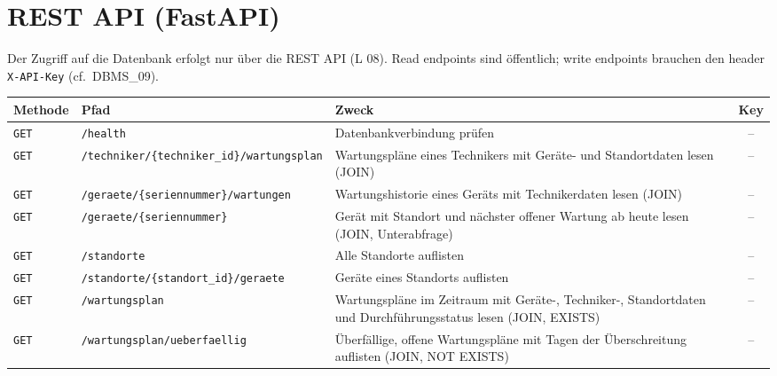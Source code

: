 \documentclass[11pt,a4paper]{article}
\begin{document}
\section{REST API (FastAPI)}

Der Zugriff auf die Datenbank erfolgt nur über die REST API (L 08). Read endpoints
sind öffentlich; write endpoints brauchen den header \texttt{X-API-Key} (cf.\ DBMS\_09).

\renewcommand{\arraystretch}{1.2}
\begingroup
\small
\renewcommand{\arraystretch}{1.2}

\begin{tabularx}{\linewidth}{
    @{}
    l
    >{\raggedright\arraybackslash}p{5.8cm}
    >{\raggedright\arraybackslash}X
    c
    @{}
}
\toprule
\textbf{Methode} & \textbf{Pfad} & \textbf{Zweck} & \textbf{Key} \\
\midrule

\texttt{GET}
& \nolinkurl{/health}
& Datenbankverbindung prüfen
& -- \\

\texttt{GET}
& \nolinkurl{/techniker/{techniker_id}/wartungsplan}
& Wartungspläne eines Technikers mit Geräte- und Standortdaten lesen (JOIN)
& -- \\

\texttt{GET}
& \nolinkurl{/geraete/{seriennummer}/wartungen}
& Wartungshistorie eines Geräts mit Technikerdaten lesen (JOIN)
& -- \\

\texttt{GET}
& \nolinkurl{/geraete/{seriennummer}}
& Gerät mit Standort und nächster offener Wartung ab heute lesen (JOIN, Unterabfrage)
& -- \\

\texttt{GET}
& \nolinkurl{/standorte}
& Alle Standorte auflisten
& -- \\

\texttt{GET}
& \nolinkurl{/standorte/{standort_id}/geraete}
& Geräte eines Standorts auflisten
& -- \\

\texttt{GET}
& \nolinkurl{/wartungsplan}
& Wartungspläne im Zeitraum mit Geräte-, Techniker-, Standortdaten und Durchführungsstatus lesen (JOIN, EXISTS)
& -- \\

\texttt{GET}
& \nolinkurl{/wartungsplan/ueberfaellig}
& Überfällige, offene Wartungspläne mit Tagen der Überschreitung auflisten (JOIN, NOT EXISTS)
& -- \\


\end{tabularx}
\end{document}
